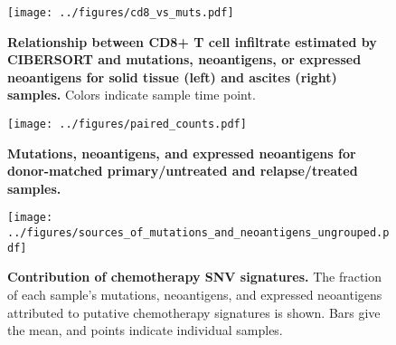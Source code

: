 \documentclass{article}
\begin{document}
\begin{figure}[htbp]
\centering
\texttt{[image: ../figures/cd8\_vs\_muts.pdf]}
\caption{\textbf{Relationship between CD8+ T cell infiltrate estimated by CIBERSORT and mutations, neoantigens, or expressed neoantigens for solid tissue (left) and ascites (right) samples.} Colors indicate sample time point.}
\label{fig:cd8vsmuts}
\end{figure}










\begin{figure}
\centering
\texttt{[image: ../figures/paired\_counts.pdf]}
\caption{\textbf{Mutations, neoantigens, and expressed neoantigens for donor-matched primary/untreated and relapse/treated samples.}}
\label{fig:supp_paired}
\end{figure}

\begin{figure}[htbp]
\centering
\texttt{[image: ../figures/sources\_of\_mutations\_and\_neoantigens\_ungrouped.pdf]}
\caption{\textbf{Contribution of chemotherapy SNV signatures.} The fraction of each sample's mutations, neoantigens, and expressed neoantigens attributed to putative chemotherapy signatures is shown. Bars give the mean, and points indicate individual samples.}
\label{fig:sourcesungrouped}
\end{figure}

\newpage
\FloatBarrier

 

\end{document}
